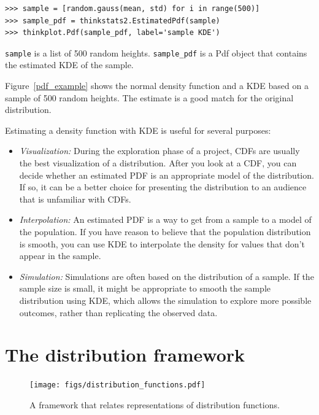 \documentclass[12pt]{book}
\theoremstyle{exercise}
\begin{document}
\begin{verbatim}
>>> sample = [random.gauss(mean, std) for i in range(500)]
>>> sample_pdf = thinkstats2.EstimatedPdf(sample)
>>> thinkplot.Pdf(sample_pdf, label='sample KDE')
\end{verbatim}

\verb"sample" is a list of 500 random heights.
\verb"sample_pdf" is a Pdf object that contains the estimated
KDE of the sample.%
%

Figure~\ref{pdf_example} shows the normal density function and a KDE
based on a sample of 500 random heights.  The estimate is a good
match for the original distribution.

Estimating a density function with KDE is useful for several purposes:

\begin{itemize}

\item {\it Visualization:\/} During the exploration phase of a project, CDFs
  are usually the best visualization of a distribution.  After you
  look at a CDF, you can decide whether an estimated PDF is an
  appropriate model of the distribution.  If so, it can be a better
  choice for presenting the distribution to an audience that is
  unfamiliar with CDFs.%
%

\item {\it Interpolation:\/} An estimated PDF is a way to get from a sample
  to a model of the population.  If you have reason to believe that
  the population distribution is smooth, you can use KDE to interpolate
  the density for values that don't appear in the sample.%

\item {\it Simulation:\/} Simulations are often based on the distribution
  of a sample.  If the sample size is small, it
  might be appropriate to smooth the sample distribution using KDE,
  which allows the simulation to explore more possible outcomes,
  rather than replicating the observed data.%

\end{itemize}


\section{The distribution framework}%

\begin{figure}
\centerline{\texttt{[image: figs/distribution\_functions.pdf]}}
\caption{A framework that relates representations of distribution
functions.}%
\label{dist_framework}
\end{figure}
\end{document}
